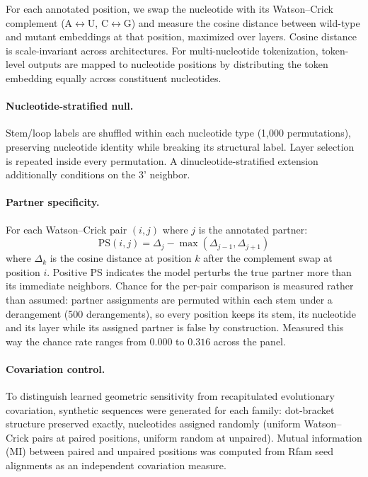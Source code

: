 \documentclass[11pt]{article}
\begin{document}
For each annotated position, we swap the nucleotide with its Watson--Crick
complement (A$\leftrightarrow$U, C$\leftrightarrow$G) and measure the cosine
distance between wild-type and mutant embeddings at that position, maximized
over layers. Cosine distance is scale-invariant across architectures.
For multi-nucleotide tokenization, token-level outputs are mapped to
nucleotide positions by distributing the token embedding equally across
constituent nucleotides.

\paragraph{Nucleotide-stratified null.}
Stem/loop labels are shuffled within each nucleotide type (1{,}000
permutations), preserving nucleotide identity while breaking its structural
label. Layer selection is repeated inside every permutation. A
dinucleotide-stratified extension additionally conditions on the 3' neighbor.

\paragraph{Partner specificity.}
\label{sec:ps-method}
For each Watson--Crick pair $(i, j)$ where $j$ is the annotated partner:
\[
\text{PS}(i,j) = \Delta_j - \max(\Delta_{j-1}, \Delta_{j+1})
\]
where $\Delta_k$ is the cosine distance at position $k$ after the complement
swap at position $i$. Positive PS indicates the model perturbs the true
partner more than its immediate neighbors. Chance for the per-pair comparison
is measured rather than assumed: partner assignments are permuted within each
stem under a derangement (500 derangements), so every position keeps its stem,
its nucleotide and its layer while its assigned partner is false by
construction. Measured this way the chance rate ranges from $0.000$ to $0.316$
across the panel.

\paragraph{Covariation control.}
To distinguish learned geometric sensitivity from recapitulated evolutionary
covariation, synthetic sequences were generated for each family: dot-bracket
structure preserved exactly, nucleotides assigned randomly (uniform
Watson--Crick pairs at paired positions, uniform random at unpaired). Mutual
information (MI) between paired and unpaired positions was computed from Rfam
seed alignments as an independent covariation measure.
\end{document}
